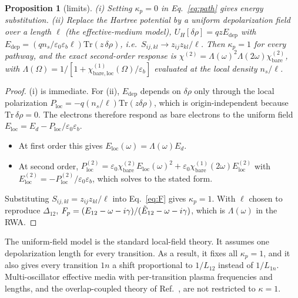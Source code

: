 \documentclass[11pt]{article}
\newcommand{\chitwo}{\chi^{(2)}}
\newcommand{\Et}{\tilde E}
\let\hbar\relax\DeclareRobustCommand{\hbar}{{\mathchar'26\mkern-9mu h}}
\newtheorem{proposition}{Proposition}
\begin{document}
\begin{proposition}[limits]\label{prop:limits}
(i) Setting $\kappa_p=0$ in Eq.~\eqref{eq:path} gives energy substitution. (ii) Replace the Hartree potential by a uniform depolarization field over a length $\ell$ (the effective-medium model), $U_H[\delta\rho]=qzE_\mathrm{dep}$ with $E_\mathrm{dep}=(qn_s/\varepsilon_0\varepsilon_b\ell)\mathrm{Tr}(z\,\delta\rho)$, i.e.\ $S_{ij,kl}\to z_{ij}z_{kl}/\ell$. Then $\kappa_p=1$ for every pathway, and the exact second-order response is $\chitwo=\Lambda(\omega)^2\Lambda(2\omega)\chitwo_\mathrm{bare}$, with $\Lambda(\Omega)=1/[1+\chi^{(1)}_\mathrm{bare,loc}(\Omega)/\varepsilon_b]$ evaluated at the local density $n_s/\ell$.
\end{proposition}
\begin{proof}
(i) is immediate. For (ii), $E_\mathrm{dep}$ depends on $\delta\rho$ only through the local polarization $P_\mathrm{loc}=-q(n_s/\ell)\mathrm{Tr}(z\delta\rho)$, which is origin-independent because $\mathrm{Tr}\,\delta\rho=0$. The electrons therefore respond as bare electrons to the uniform field $E_\mathrm{loc}=E_d-P_\mathrm{loc}/\varepsilon_0\varepsilon_b$.
\begin{itemize}
\item At first order this gives $E_\mathrm{loc}(\omega)=\Lambda(\omega)E_d$.
\item At second order, $P^{(2)}_\mathrm{loc}=\varepsilon_0\chitwo_\mathrm{bare}E_\mathrm{loc}(\omega)^2+\varepsilon_0\chi^{(1)}_\mathrm{bare}(2\omega)E^{(2)}_\mathrm{loc}$ with $E^{(2)}_\mathrm{loc}=-P^{(2)}_\mathrm{loc}/\varepsilon_0\varepsilon_b$, which solves to the stated form.
\end{itemize}
Substituting $S_{ij,kl}=z_{ij}z_{kl}/\ell$ into Eq.~\eqref{eq:F} gives $\kappa_p=1$. With $\ell$ chosen to reproduce $\Delta_{12}$, $F_p=(E_{12}-\hbar\omega-i\gamma)/(\Et_{12}-\hbar\omega-i\gamma)$, which is $\Lambda(\omega)$ in the RWA.
\end{proof}

The uniform-field model is the standard local-field theory. It assumes one depolarization length for every transition. As a result, it fixes all $\kappa_p=1$, and it also gives every transition $1n$ a shift proportional to $1/L_{12}$ instead of $1/L_{1n}$. Multi-oscillator effective media with per-transition plasma frequencies and lengths, and the overlap-coupled theory of Ref.~\cite{Krieguer2024}, are not restricted to $\kappa=1$.
\end{document}
